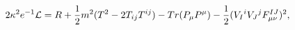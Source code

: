 \begin{equation}
2\kappa^2e^{-1}{\cal L} = R + {1\over 2} m^2 (T^2 - 2T_{ij}T^{ij}) -
Tr(P_{\mu} P^{\mu}) - {1\over 2} (V_I{}^i V_J{}^j F_{\mu \nu}^{IJ})^2,
\label{sug}
\end{equation}

